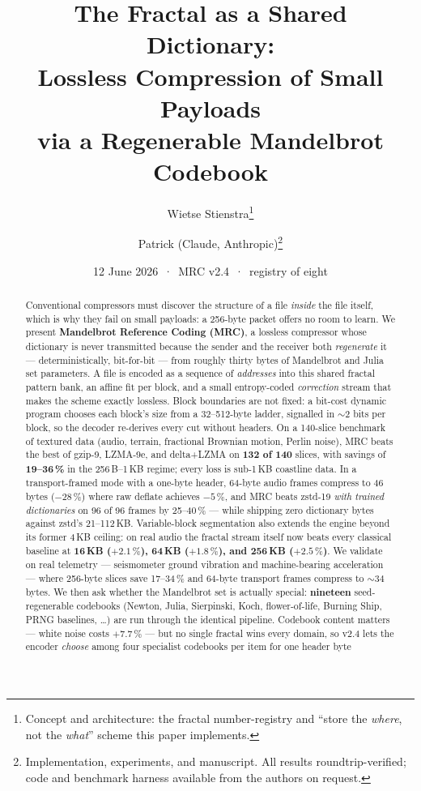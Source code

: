 \documentclass[11pt,a4paper]{article}
\title{\textbf{The Fractal as a Shared Dictionary:\\
Lossless Compression of Small Payloads\\
via a Regenerable Mandelbrot Codebook}}
\author{Wietse Stienstra\thanks{Concept and architecture: the fractal number-registry
and ``store the \emph{where}, not the \emph{what}'' scheme this paper implements.}
\and Patrick (Claude, Anthropic)\thanks{Implementation, experiments, and manuscript.
All results roundtrip-verified; code and benchmark harness available from the authors on request.}}
\date{12 June 2026 \,·\, MRC v2.4 \,·\, registry of eight}
\begin{document}
\maketitle

\begin{abstract}
\noindent
Conventional compressors must discover the structure of a file \emph{inside} the
file itself, which is why they fail on small payloads: a 256-byte packet offers
no room to learn. We present \textbf{Mandelbrot Reference Coding (MRC)}, a lossless
compressor whose dictionary is never transmitted because the sender and the
receiver both \emph{regenerate} it --- deterministically, bit-for-bit --- from
roughly thirty bytes of Mandelbrot and Julia set parameters. A file is encoded as a
sequence of \emph{addresses} into this shared fractal pattern bank, an affine
fit per block, and a small entropy-coded \emph{correction} stream that makes
the scheme exactly lossless. Block boundaries are not fixed: a bit-cost dynamic
program chooses each block's size from a 32--512-byte ladder, signalled in
${\sim}2$ bits per block, so the decoder re-derives every cut without headers.
On a 140-slice benchmark of textured data (audio, terrain, fractional Brownian
motion, Perlin noise), MRC beats the best of gzip-9, LZMA-9e, and delta+LZMA on
\textbf{132 of 140} slices, with savings of \textbf{19--36\,\%} in the
256\,B--1\,KB regime; every loss is sub-1\,KB coastline data. In a
transport-framed mode with a one-byte header, 64-byte audio frames compress to
46 bytes ($-28\,\%$) where raw deflate achieves $-5\,\%$, and MRC beats zstd-19
\emph{with trained dictionaries} on 96 of 96 frames by 25--40\,\% --- while
shipping zero dictionary bytes against zstd's 21--112\,KB. Variable-block
segmentation also extends the engine beyond its former 4\,KB ceiling: on real
audio the fractal stream itself now beats every classical baseline at
\textbf{16\,KB ($+2.1\,\%$), 64\,KB ($+1.8\,\%$), and 256\,KB ($+2.5\,\%$)}.
We validate on real telemetry --- seismometer ground vibration and machine-bearing
acceleration --- where 256-byte slices save 17--34\,\% and 64-byte transport
frames compress to ${\sim}34$ bytes. We then ask whether the Mandelbrot set is
actually special: \textbf{nineteen} seed-regenerable codebooks (Newton, Julia,
Sierpinski, Koch, flower-of-life, Burning Ship, PRNG baselines, \ldots) are run
through the identical pipeline. Codebook content matters --- white noise costs
$+7.7\,\%$ --- but no single fractal wins every domain, so v2.4 lets the encoder
\emph{choose} among four specialist codebooks per item for one header byte

\end{abstract}
\end{document}
